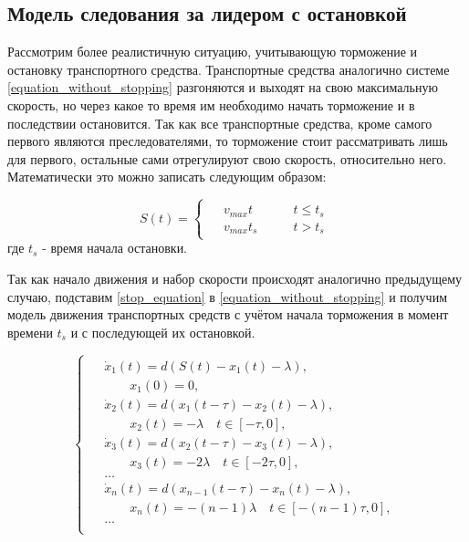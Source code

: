 \documentclass[12pt, a4paper]{extarticle}
\numberwithin{equation}{section}
\begin{document}
\subsection{Модель следования за лидером с остановкой}

Рассмотрим более реалистичную ситуацию, учитывающую торможение и остановку транспортного средства. Транспортные средства аналогично системе \eqref{equation_without_stopping} разгоняются и выходят на свою максимальную скорость, но через какое то время им необходимо начать торможение и в последствии остановится. Так как все транспортные средства, кроме самого первого являются преследователями, то торможение стоит рассматривать лишь для первого, остальные сами отрегулируют свою скорость, относительно него. Математически это можно записать следующим образом:
  
\begin{equation} \label{stop_equation}
 S(t) = 
 \begin{cases}
 \begin{split}
 &v_{max} t \qquad &t \leqslant t_s \\
 &v_{max} t_s \qquad &t > t_s
 \end{split}
 \end{cases}
\end{equation}
где $t_s$ - время начала остановки.

Так как начало движения и набор скорости происходят аналогично предыдущему случаю, подставим  \eqref{stop_equation} в \eqref{equation_without_stopping} и получим модель движения транспортных средств с учётом начала торможения в момент времени $t_s$ и с последующей их остановкой. 
  
\begin{equation} \label{equation_with_stopping}
\begin{cases}
\begin{split}
&\dot{x}_1(t) = d (S(t) - x_1(t) - \lambda), \\ 
&\qquad x_1(0) = 0, \\
&\dot{x}_2(t) = d (x_1(t-\tau)-x_2(t) - \lambda), \\
&\qquad x_2(t) = -\lambda \quad t \in [-\tau, 0], \\
&\dot{x}_3(t) = d (x_2(t-\tau)-x_3(t) - \lambda), \\
&\qquad x_3(t) = -2\lambda \quad t \in [-2\tau, 0], \\
&\ldots \\
&\dot{x}_n(t) = d ({x}_{n-1}(t-\tau)-x_n(t) - \lambda), \\
&\qquad x_n(t) = -(n-1)\lambda \quad t \in [-(n-1)\tau, 0], \\
&\ldots \\
\end{split}
\end{cases}
\end{equation}
\end{document}
